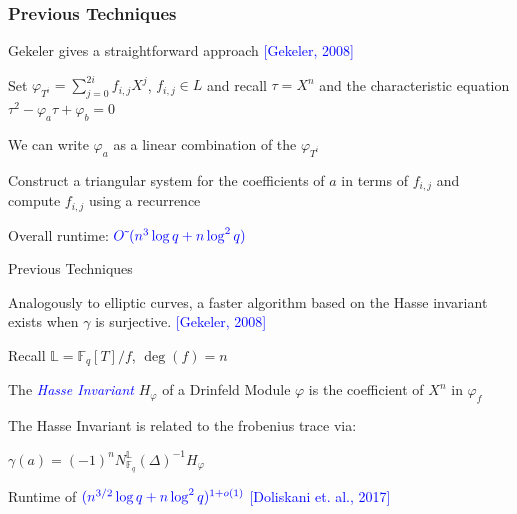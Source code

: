 \documentclass{beamer}
\newcommand{\blue}{\textcolor{blue}}
\newcommand{\spa}{\vspace{0.2cm}}
\newcommand{\spa}{\textnormal{ }}
\begin{document}





\begin{frame}
\frametitle{Previous Techniques}


     Gekeler gives a straightforward approach \blue{[Gekeler, 2008]}
     
     \spa
     
    Set $\varphi_{T^i} = \sum_{j=0}^{2i}f_{i,j} X^j$, $f_{i,j} \in L$ and recall $\tau = X^n$ and the characteristic equation $\tau^2 - \varphi_a\tau + \varphi_b = 0$
    
    \spa
    
    We can write $\varphi_a$ as a linear combination of the $\varphi_{T^i}$
    
    \spa
    
     Construct a triangular system for the coefficients of $a$ in terms of $f_{i,j}$ and compute $f_{i,j}$ using a recurrence
     
     \spa
     Overall runtime: $\blue{O\tilde{~}(n^3 \log q + n\log^2 q)}$



\end{frame}









\begin{frame}{Previous Techniques}


Analogously to elliptic curves, a faster algorithm based on the Hasse invariant exists when $\gamma$ is surjective. \blue{[Gekeler, 2008]}

\spa

Recall $\mathbb{L} = \mathbb{F}_q[T]/f$, $\deg(f) = n$

\begin{definition}
    The \blue{\textit{Hasse Invariant}} $H_{\varphi}$ of a Drinfeld Module $\varphi$ is the coefficient of $X^n$ in $\varphi_f$
\end{definition}

\spa

The Hasse Invariant is related to the frobenius trace via:
\vspace{0.2cm}

\centerline{$\gamma(a) = (-1)^n N_{\mathbb{F}_q}^{\mathbb{L}}(\Delta)^{-1}H_{\varphi}$ }

\spa

Runtime of $\blue{(n^{3/2} \log q + n \log^2 q)^{1+o(1)}}$ \blue{[Doliskani et. al., 2017]}








\end{frame}
\end{document}
